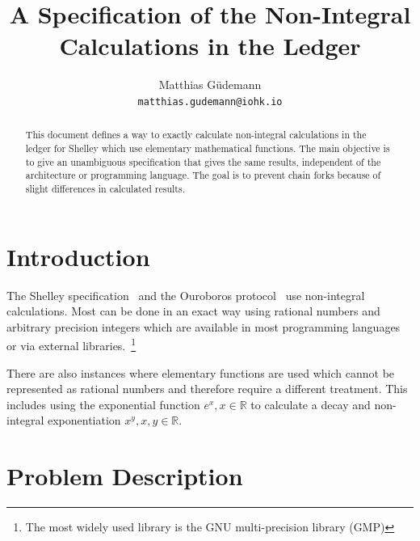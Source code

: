 \documentclass[11pt,a4paper,dvipsnames]{article}
\theoremstyle{definition}
\theoremstyle{definition}
\begin{document}

\title{A Specification of the Non-Integral Calculations in the Ledger}

\author{Matthias G\"udemann  \\ {\small \texttt{matthias.gudemann@iohk.io}}}


\maketitle

\begin{abstract}
  This document defines a way to exactly calculate non-integral calculations in
  the ledger for Shelley which use elementary mathematical functions. The main
  objective is to give an unambiguous specification that gives the same results,
  independent of the architecture or programming language. The goal is to
  prevent chain forks because of slight differences in calculated results.
\end{abstract}

\tableofcontents
\listoffigures

\section{Introduction}
\label{sec:introduction}

The Shelley specification~\cite{shelley_spec} and the Ouroboros
protocol~\cite{ouroboros} use non-integral calculations. Most can be done in an
exact way using rational numbers and arbitrary precision integers which are
available in most programming languages or via external libraries.~\footnote{The
  most widely used library is the GNU multi-precision library (GMP)}

There are also instances where elementary functions are used which cannot be
represented as rational numbers and therefore require a different
treatment. This includes using the exponential function
$e^{x}, x \in \mathbb{R}$ to calculate a decay and non-integral exponentiation
$x^{y}, x, y \in \mathbb{R}$.

\section{Problem Description}
\label{sec:problem-description}
\end{document}
